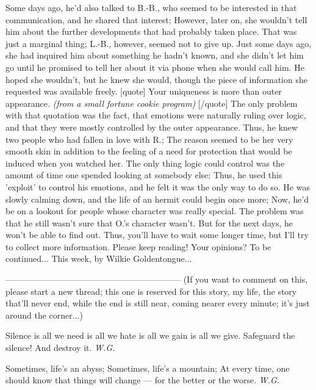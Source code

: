 Some days ago, he'd also talked to B.-B., who seemed to be interested in that communication, and he shared that interest; However, later on, she wouldn't tell him about the further developments that had probably taken place. 
That was just a marginal thing; L.-B., however, seemed not to give up. Just some days ago, she had inquired him about something he hadn't known, and she didn't let him go until he promised to tell her about it via phone when she would call him. He hoped she wouldn't, but he knew she would, though the piece of information she requested was available freely. 
[quote]
Your uniqueness is more than outer appearance. 
\emph{(from a small fortune cookie program)}
[/quote]
The only problem with that quotation was the fact, that emotions were naturally ruling over logic, and that they were mostly controlled by the outer appearance. Thus, he knew two people who had fallen in love with R.; The reason seemed to be her very smooth skin in addition to the feeling of a need for protection that would be induced when you watched her. 
The only thing logic could control was the amount of time one spended looking at somebody else; Thus, he used this 'exploit' to control his emotions, and he felt it was the only way to do so. 
He was slowly calming down, and the life of an hermit could begin once more; Now, he'd be on a lookout for people whose character was really special. 
The problem was that he still wasn't sure that O.'s character wasn't. 
But for the next days, he won't be able to find out. Thus, you'll have to wait some longer time, but I'll try to collect more information. 
Please keep reading!
Your opinions?
To be continued...
This week, by Wilkie Goldentongue...

--------------------------------------------------------------
(If you want to comment on this, please start a new thread; this one is reserved for this story, my life, the story that'll never end, while the end is still near, coming nearer every minute; it's just around the corner...)

Silence 
is all we need 
is all we hate 
is all we gain 
is all we give. 
Safeguard the silence! 
And destroy it. 
\emph{W.G.}

Sometimes, 
life's an abyss; 
Sometimes, 
life's a mountain; 
At every time, 
one should know 
that things will change --- 
for the better 
or the worse. 
\emph{W.G.}

